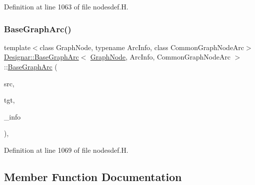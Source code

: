 Definition at line 1063 of file nodesdef.\+H.

\mbox{\label{class_designar_1_1_base_graph_arc_a150cb81ef3f2baac1abee99adae6f410}} 
\subsubsection{\texorpdfstring{Base\+Graph\+Arc()}{BaseGraphArc()}\hspace{0.1cm}{\footnotesize\ttfamily [4/4]}}
{\footnotesize\ttfamily template$<$class Graph\+Node, typename Arc\+Info, class Common\+Graph\+Node\+Arc$>$ \\
\hyperlink{class_designar_1_1_base_graph_arc}{Designar\+::\+Base\+Graph\+Arc}$<$ \hyperlink{class_designar_1_1_graph_node}{Graph\+Node}, Arc\+Info, Common\+Graph\+Node\+Arc $>$\+::\hyperlink{class_designar_1_1_base_graph_arc}{Base\+Graph\+Arc} (\begin{DoxyParamCaption}\item[{\hyperlink{class_designar_1_1_graph_node}{Graph\+Node} $\ast$}]{src,  }\item[{\hyperlink{class_designar_1_1_graph_node}{Graph\+Node} $\ast$}]{tgt,  }\item[{Arc\+Info \&\&}]{\+\_\+info }\end{DoxyParamCaption})\hspace{0.3cm}{\ttfamily [inline]}, {\ttfamily [protected]}}



Definition at line 1069 of file nodesdef.\+H.



\subsection{Member Function Documentation}
\mbox{\label{class_designar_1_1_base_graph_arc_a756bd68ff9797ff54b53657c2a39730c}} 
